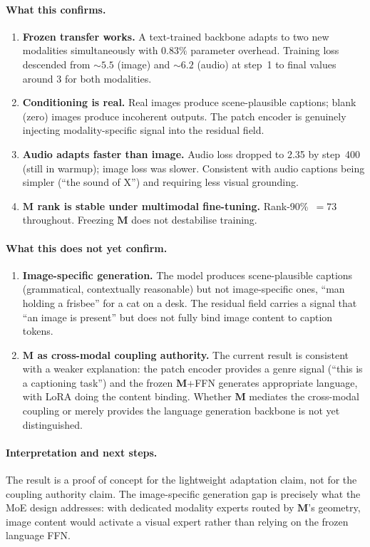 \documentclass[11pt, a4paper]{article}
\newcommand{\M}{\mathbf{M}}
\theoremstyle{plain}
\theoremstyle{remark}
\begin{document}
\paragraph{What this confirms.}
\begin{enumerate}[nosep]
    \item \textbf{Frozen transfer works.}  A text-trained backbone adapts to two new modalities simultaneously with $0.83\%$ parameter overhead.  Training loss descended from ${\sim}5.5$ (image) and ${\sim}6.2$ (audio) at step~1 to final values around 3 for both modalities.
    \item \textbf{Conditioning is real.}  Real images produce scene-plausible captions; blank (zero) images produce incoherent outputs.  The patch encoder is genuinely injecting modality-specific signal into the residual field.
    \item \textbf{Audio adapts faster than image.}  Audio loss dropped to 2.35 by step~400 (still in warmup); image loss was slower.  Consistent with audio captions being simpler (``the sound of X'') and requiring less visual grounding.
    \item \textbf{$\M$ rank is stable under multimodal fine-tuning.}  Rank-90\%~$= 73$ throughout.  Freezing $\M$ does not destabilise training.
\end{enumerate}

\paragraph{What this does not yet confirm.}
\begin{enumerate}[nosep]
    \item \textbf{Image-specific generation.}  The model produces scene-plausible captions (grammatical, contextually reasonable) but not image-specific ones, ``man holding a frisbee'' for a cat on a desk.  The residual field carries a signal that ``an image is present'' but does not fully bind image content to caption tokens.
    \item \textbf{$\M$ as cross-modal coupling authority.}  The current result is consistent with a weaker explanation: the patch encoder provides a genre signal (``this is a captioning task'') and the frozen $\M$+FFN generates appropriate language, with LoRA doing the content binding.  Whether $\M$ mediates the cross-modal coupling or merely provides the language generation backbone is not yet distinguished.
\end{enumerate}

\paragraph{Interpretation and next steps.}
The result is a proof of concept for the lightweight adaptation claim, not for the coupling authority claim.
The image-specific generation gap is precisely what the MoE design addresses: with dedicated modality experts routed by $\M$'s geometry, image content would activate a visual expert rather than relying on the frozen language FFN.
\end{document}
